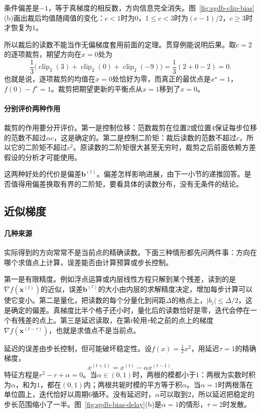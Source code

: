 条件偏差是$-1$，等于真梯度的相反数，方向信息完全消失。图~\ref{fig:sgdb-clip-bias}(b)画出裁后均值随阈值的变化：$c<1$时为$0$，$1\leq c<3$时为$(c-1)/2$，$c\geq3$时才恢复为$1$。

所以裁后的读数不能当作无偏梯度套用前面的定理。贯穿例能说明后果。取$c=2$的逐项裁剪，期望方向在$x=0$处为
\[
 \frac13\bigl(\operatorname{clip}_2(3)+\operatorname{clip}_2(0)+\operatorname{clip}_2(-9)\bigr)=\frac13(2+0-2)=0.
\]
也就是说，逐项裁剪的均值在$x=0$处恰好为零，而真正的最优点是$x^\star=1$，$f(0)-f^\star=1$。裁剪把期望更新的平衡点从$x=1$移到了$x=0$。

\paragraph{分别评价两种作用}
裁剪的作用要分开评价。第一是控制位移：范数裁剪在位置$2$或位置$4$保证每步位移的范数不超过$\alpha c$，这是确定的。第二是控制二阶矩：裁后读数的范数不超过$c$，所以它的二阶矩不超过$c^2$。原读数的二阶矩很大甚至无穷时，裁剪之后前面依赖方差假设的分析才可能使用。

这两种好处的代价是偏差$\bm{b}^{(t)}$。偏差怎样影响进展，由下一小节的递推回答。是否值得用偏差换取有界的二阶矩，要看具体的读数分布，没有无条件的结论。

\subsection{近似梯度}
\label{sec:sgdb-approximate}

\paragraph{几种来源}
实际得到的方向常常不是当前点的精确读数。下面三种情形都先问两件事：方向在哪个求值点上计算，误差能否由计算预算或步长控制。

第一是有限精度。例如浮点运算或内层线性方程只解到某个残差，读到的是$\nabla f(\bm{x}^{(t)})$的近似，误差$\bm{b}^{(t)}$的大小由内层的求解精度决定，增加每步计算可以使它变小。第二是量化，把读数的每个分量化到间距$\Delta$的格点上，$\lvert b_j\rvert\leq\Delta/2$，这是确定的偏差。真梯度比半个格子还小时，量化后的读数恰好是零，迭代会停在一个有残差的点上。第三是延迟读取，在第$t$轮用$\tau$轮之前的点上的梯度$\nabla f(\bm{x}^{(t-\tau)})$，也就是求值点不是当前点。

延迟的误差由步长控制，但可能破坏稳定性。设$f(x)=\frac12x^2$，用延迟$\tau=1$的精确梯度，
\[
 x^{(t+1)}=x^{(t)}-\alpha x^{(t-1)}.
\]
特征方程是$r^2-r+\alpha=0$。当$\alpha\in(0,1)$时，两根的模都小于$1$：两根为实数时积为$\alpha$，和为$1$，都在$(0,1)$内；两根共轭时模的平方等于积$\alpha$。当$\alpha=1$时两根落在单位圆上，迭代恰好以周期$6$循环。没有延迟时，$\alpha$可以取到$2$，所以延迟把稳定的步长范围缩小了一半。图~\ref{fig:sgdb-bias-delay}(b)是$\alpha=1$的情形，$\tau=2$时发散。

